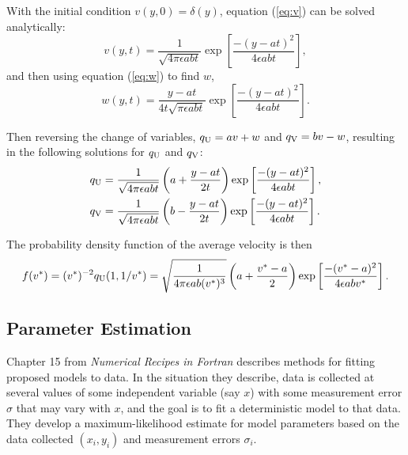 \documentclass{article}
\newcommand{\tn}{\textnormal}
\begin{document}
With the initial condition $v(y, 0) = \delta(y)$, equation
(\ref{eq:v}) can be solved analytically:
\begin{equation}
  \label{eq:v-soln}
  v(y, t) = \frac{1}{\sqrt{4 \pi \epsilon a b t}} \exp \left[ \frac{-(y
      - at)^2}{4 \epsilon a b t} \right],
\end{equation}
and then using equation (\ref{eq:w}) to find $w$,
\begin{equation}
  \label{eq:w-soln}
  w(y, t) = \frac{y - at}{4t\sqrt{\pi \epsilon a b t}} \exp \left[ \frac{-(y
      - at)^2}{4 \epsilon a b t} \right].
\end{equation}

Then reversing the change of variables, $q_\tn{U} = av + w$ and
$q_\tn{V} = bv - w$, resulting in the following solutions for
$q_\tn{U}$ and $q_\tn{V}$:
\begin{align}
  \label{eq:qu-soln}
  q_\tn{U} &= \frac{1}{\sqrt{4 \pi \epsilon a b t}} \left(a + \frac{y
             - at}{2t} \right) \exp \left[ \frac{-(y - at)^2}{4
             \epsilon a b t} \right], \\
  \label{eq:qv-soln}
  q_\tn{V} &= \frac{1}{\sqrt{4 \pi \epsilon a b t}} \left(b - \frac{y
             - at}{2t} \right) \exp \left[ \frac{-(y - at)^2}{4
             \epsilon a b t} \right].
\end{align}

The probability density function of the average velocity is then
\begin{equation}
  \label{eq:vel-dens}
  f(v^*) = (v^*)^{-2} q_\tn{U}(1, 1/v^*) = \sqrt{\frac{1}{4 \pi
      \epsilon a b (v^*)^3}}
  \left(a + \frac{v^* - a}{2} \right) \exp\left[ \frac{-(v^* -
      a)^2}{4\epsilon a b v^*} \right].
\end{equation}

\subsection{Parameter Estimation}
\label{sec:parameter-estimation}

Chapter 15 from \textit{Numerical Recipes in Fortran} describes
methods for fitting proposed models to data. In the situation they
describe, data is collected at several values of some independent
variable (say $x$) with some measurement error $\sigma$ that may vary
with $x$, and the goal is to fit a deterministic model to that
data. They develop a maximum-likelihood estimate for model parameters
based on the data collected $(x_i, y_i)$ and measurement errors
$\sigma_i$. 
\end{document}
